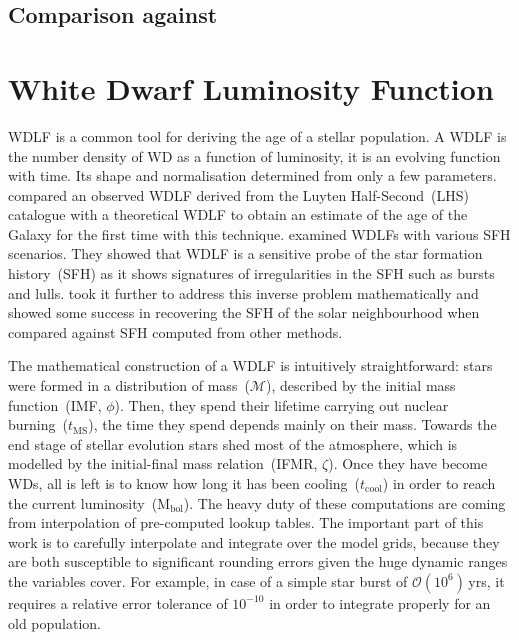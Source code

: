 \documentclass[fleqn,usenatbib]{rasti}
\begin{document}
\subsection{Comparison against \citet{2021MNRAS.508.3877G}}




\section{White Dwarf Luminosity Function}
WDLF is a common tool for deriving the age of a stellar population. A WDLF is
the number density of WD as a function of luminosity, it is an evolving
function with time. Its shape and normalisation determined from only a few
parameters. \citet{1987ApJ...315L..77W} compared an observed WDLF derived from
the Luyten Half-Second~(LHS) catalogue with a theoretical WDLF to obtain an
estimate of the age of the Galaxy for the first time with this technique.
\citet{1990ApJ...352..605N} examined WDLFs with various SFH scenarios. They
showed that WDLF is a sensitive probe of the star formation history~(SFH) as
it shows signatures of irregularities in the SFH such as bursts and lulls.
\citet{2013MNRAS.434.1549R} took it further to address this inverse problem
mathematically and showed some success in recovering the SFH of the solar
neighbourhood when compared against SFH computed from other methods.


The mathematical construction of a WDLF is intuitively straightforward: stars
were formed in a distribution of mass~($\mathcal{M}$), described by the initial
mass function~(IMF, $\phi$). Then, they spend their lifetime carrying out
nuclear burning~($t_{\mathrm{MS}}$), the time they spend depends mainly on
their mass. Towards the end stage of stellar evolution stars shed most of the
atmosphere, which is modelled by the initial-final mass relation~(IFMR,
$\zeta$). Once they have become WDs, all is left is to know how long it has
been cooling~($t_{\mathrm{cool}}$) in order to reach the current
luminosity~($\mathrm{M}_\mathrm{bol}$). The heavy duty of these computations
are coming from interpolation of pre-computed lookup tables. The important
part of this work is to carefully interpolate and integrate over the model
grids, because they are both susceptible to significant rounding errors given
the huge dynamic ranges the variables cover. For example, in case of a simple
star burst of $\mathcal{O}(10^6)$\,yrs, it requires a relative error
tolerance of $10^{-10}$ in order to integrate properly for an old population.
\end{document}

